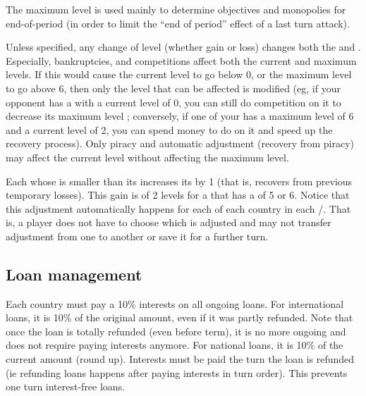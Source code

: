  The maximum level is used mainly to determine
objectives and monopolies for end-of-period \VPs (in order to limit the ``end
of period'' effect of a last turn attack).

 Unless specified, any change of level (whether gain
or loss) changes both the  and .
\bparag Especially, bankruptcies, \TFI and competitions affect both the
current and maximum levels.
\bparag If this would cause the current level to go below 0, or the maximum
level to go above 6, then only the level that can be affected is modified (eg,
if your opponent has a \TradeFLEET with a current level of 0, you can still do
competition on it to decrease its maximum level ; conversely, if one of your
\TradeFLEET has a maximum level of 6 and a current level of 2, you can spend
money to do \TFI on it and speed up the recovery process).
\bparag Only piracy and automatic adjustment (recovery from piracy) may affect
the current level without affecting the maximum level.

 Each \TradeFLEET whose  is
smaller than its  increases its  by
1 (that is, recovers from previous temporary losses).
\bparag This gain is of 2 levels for a \TradeFLEET that has a  of 5 or 6. %
\bparag Notice that this adjustment automatically happens for each \TradeFLEET
of each country in each \CTZ/\STZ. That is, a player does not have to choose
which \TradeFLEET is adjusted and may not transfer adjustment from one
\TradeFLEET to another or save it for a further turn.




\subsection{Loan management}

\aparag[Interests] Each country must pay a 10\% interests on all ongoing
loans.
\bparag For international loans, it is 10\% of the original amount, even if it
was partly refunded. Note that once the loan is totally refunded (even before
term), it is no more ongoing and does not require paying interests anymore.
\bparag For national loans, it is 10\% of the current amount (round up).
\bparag Interests must be paid the turn the loan is refunded (ie refunding
loans happens after paying interests in turn order). This prevents one turn
interest-free loans.


